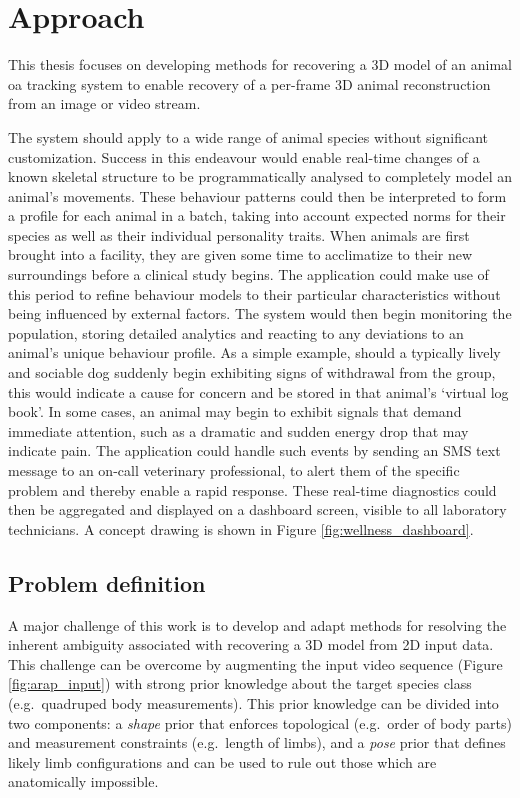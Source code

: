 \section{Approach} %

This thesis focuses on developing methods for recovering a 3D model of an animal oa tracking system to enable recovery of a per-frame 3D animal reconstruction from an image or video stream. 

The system should apply to a wide range of animal species without significant customization. Success in this endeavour would enable real-time changes of a known skeletal structure to be programmatically analysed to completely model an animal’s movements. These behaviour patterns could then be interpreted to form a profile for each animal in a batch, taking into account expected norms for their species as well as their individual personality traits. When animals are first brought into a facility, they are given some time to acclimatize to their new surroundings before a clinical study begins. The application could make use of this period to refine behaviour models to their particular characteristics without being influenced by external factors. The system would then begin monitoring the population, storing detailed analytics and reacting to any deviations to an animal’s unique behaviour profile. As a simple example, should a typically lively and sociable dog suddenly begin exhibiting signs of withdrawal from the group, this would indicate a cause for concern and be stored in that animal’s ‘virtual log book’. In some cases, an animal may begin to exhibit signals that demand immediate attention, such as a dramatic and sudden energy drop that may indicate pain. The application could handle such events by sending an SMS text message to an on-call veterinary professional, to alert them of the specific problem and thereby enable a rapid response. These real-time diagnostics could then be aggregated and displayed on a dashboard screen, visible to all laboratory technicians. A concept drawing is shown in Figure \ref{fig:wellness_dashboard}.

\subsection{Problem definition}
    A major challenge of this work is to develop and adapt methods for resolving the inherent ambiguity associated with recovering a 3D model from 2D input data. This challenge can be overcome by augmenting the input video sequence (Figure \ref{fig:arap_input}) with strong prior knowledge about the target species class (e.g.\ quadruped body measurements). This prior knowledge can be divided into two components: a \emph{shape} prior that enforces topological (e.g.\ order of body parts) and measurement constraints (e.g.\ length of limbs), and a \emph{pose} prior that defines likely limb configurations and can be used to rule out those which are anatomically impossible.

